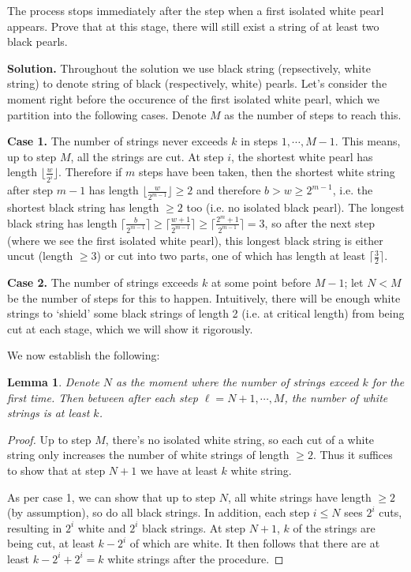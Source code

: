\documentclass[11pt]{article}
\newcommand{\<}{\langle}
\renewcommand{\>}{\rangle}
\newtheorem{lemma}{Lemma}
\begin{document}
\begin{enumerate}
	The process stops immediately after the step when a first isolated white pearl appears.
	Prove that at this stage, there will still exist a string of at least two black pearls.
	
	\textbf{Solution.} 
	Throughout the solution we use black string (repsectively, white string) to denote string of black (respectively, white) pearls. 
	Let's consider the moment right before the occurence of the first isolated white pearl, which we partition into the following cases. Denote $M$ as the number of steps to reach this. 
	
	\textbf{Case 1.} 
	The number of strings never exceeds $k$ in steps $1, \cdots, M-1$. 
	This means, up to step $M$, all the strings are cut. 
	At step $i$, the shortest white pearl has length $\lfloor \frac{w}{2^i}\rfloor$. Therefore if $m$ steps have been taken, then the shortest white string after step $m-1$ has length $\lfloor \frac{w}{2^{m-1}}\rfloor\ge 2$ and therefore $b > w\ge 2^{m-1}$, 
	i.e. the shortest black string has length $\ge 2$ too (i.e. no isolated black pearl). 
	The longest black string has length 
	$\lceil \frac{b}{2^{m-1}}\rceil\ge \lceil \frac{w+1}{2^{m-1}}\rceil\ge \lceil \frac{2^m+1}{2^{m-1}}\rceil=3$, 
	so after the next step (where we see the first isolated white pearl), 
	this longest black string is either uncut (length $\ge 3$)
	or cut into two parts, one of which has length at least $\lceil \frac{3}{2}\rceil$. 
	
	\textbf{Case 2.} 
	The number of strings exceeds $k$ at some point before $M - 1$; let $N < M$ be the number of steps for this to happen. 
	Intuitively, there will be enough white strings to `shield' some black strings of length 2 (i.e. at critical length) from being cut at each stage, which we will show it rigorously. 
	
	We now establish the following: 
	\begin{lemma}
		Denote $N$ as the moment where the number of strings exceed $k$ for the first time. 
		Then between after each step $\ell=N+1, \cdots, M$, the number of white strings is at least $k$. 
	\end{lemma}
    \begin{proof}
    	Up to step $M$, there's no isolated white string, so each cut of a white string only increases the number of white strings of length $\ge 2$. 
    	Thus it suffices to show that at step $N + 1$ we have at least $k$ white string. 
    	
    	As per case 1, we can show that up to step $N$, all white strings have length $\ge 2$ (by assumption), 
    	so do all black strings. 
    	In addition, each step $i\le N$ sees $2^i$ cuts, resulting in $2^i$ white and $2^i$ black strings. 
    	At step $N + 1$, $k$ of the strings are being cut, at least $k-2^i$ of which are white. 
    	It then follows that there are at least $k-2^i+2^i=k$ white strings after the procedure. 
    \end{proof}
    

\end{enumerate}
\end{document}
